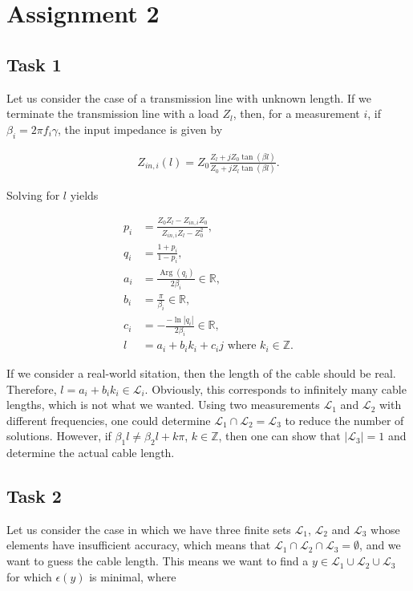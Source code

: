 \documentclass[11pt,titlepage]{report}
\begin{document}
\chapter{Assignment 2}
\section{Task 1}
Let us consider the case of a transmission line with unknown length. If we terminate the transmission line with a load $Z_l$, then, for a measurement $i$, if $\beta_i=2 \pi f_i \gamma$, the input impedance is given by

\begin{align}
	Z_{in,i}(l)=Z_0\frac{Z_l+j Z_0 \tan{(\beta l)}}{Z_0+j Z_l \tan{(\beta l)}}.
\end{align}

Solving for $l$ yields

\begin{align}
	p_i &= \frac{Z_0 Z_l - Z_{in,i} Z_0}{Z_{in,i} Z_l - Z_0^2}, \\
	q_i &= \frac{1+p_i}{1-p_i}, \\
	a_i &= \frac{\operatorname{Arg}(q_i)}{ 2\beta_i} \in \mathbb{R}, \\
	b_i &= \frac{\pi}{\beta_i} \in \mathbb{R}, \\
	c_i &= -\frac{-\operatorname{ln}|q_i|}{2 \beta_i} \in \mathbb{R}, \\
	l &= a_i + b_i k_i + c_i j \text{ where } k_i \in \mathbb{Z}.
\end{align}

If we consider a real-world sitation, then the length of the cable should be real. Therefore, $l=a_i+b_i k_i \in \mathcal{L}_i$. Obviously, this corresponds to infinitely many cable lengths, which is not what we wanted. Using two measurements $\mathcal{L}_1$ and $\mathcal{L}_2$ with different frequencies, one could determine $\mathcal{L}_1 \cap \mathcal{L}_2 = \mathcal{L}_3$ to reduce the number of solutions. However, if $\beta_{1} l \neq \beta_{2} l + k \pi$, $k \in \mathbb{Z}$, then one can show that $|\mathcal{L}_3|=1$ and determine the actual cable length.

\section{Task 2}
Let us consider the case in which we have three finite sets $\mathcal{L}_1$, $\mathcal{L}_2$ and $\mathcal{L}_3$ whose elements have insufficient accuracy, which means that $\mathcal{L}_1 \cap \mathcal{L}_2 \cap \mathcal{L}_3 = \emptyset$, and we want to guess the cable length. This means we want to find a $y \in \mathcal{L}_1 \cup \mathcal{L}_2 \cup \mathcal{L}_3$ for which $\epsilon(y)$ is minimal, where
\end{document}
